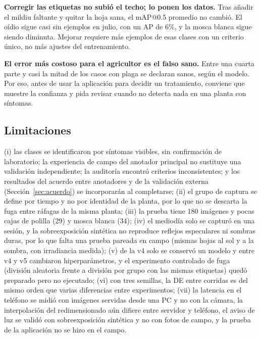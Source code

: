 \documentclass[sensors,article,submit,pdftex,moreauthors]{Definitions/mdpi}
\begin{document}
\textbf{Corregir las etiquetas no subió el techo; lo ponen los datos.} Tras añadir el mildiu faltante y quitar la hoja sana, el mAP@0.5 promedio no cambió. El oídio sigue casi sin ejemplos en julio, con un AP de 6\%, y la mosca blanca sigue siendo diminuta. Mejorar requiere más ejemplos de esas clases con un criterio único, no más ajustes del entrenamiento.

\textbf{El error más costoso para el agricultor es el falso sano.} Entre una cuarta parte y casi la mitad de los casos con plaga se declaran sanos, según el modelo. Por eso, antes de usar la aplicación para decidir un tratamiento, conviene que muestre la confianza y pida revisar cuando no detecta nada en una planta con síntomas.

\subsection{Limitaciones}\label{sec:limitaciones}

(i) las clases se identificaron por síntomas visibles, sin confirmación de laboratorio; la experiencia de campo del anotador principal no sustituye una validación independiente; la auditoría encontró criterios inconsistentes; y los resultados del acuerdo entre anotadores y de la validación externa (Sección~\ref{sec:acuerdo}) se incorporarán al completarse; (ii) el grupo de captura se define por tiempo y no por identidad de la planta, por lo que no se descarta la fuga entre ráfagas de la misma planta; (iii) la prueba tiene 180 imágenes y pocas cajas de polilla (29) y mosca blanca (34); (iv) el mediodía solo se capturó en una sesión, y la sobreexposición sintética no reproduce reflejos especulares ni sombras duras, por lo que falta una prueba pareada en campo (mismas hojas al sol y a la sombra, con irradiancia medida); (v) de la v4 solo se conservó un modelo y entre v4 y v5 cambiaron hiperparámetros, y el experimento controlado de fuga (división aleatoria frente a división por grupo con las mismas etiquetas) quedó preparado pero no ejecutado; (vi) con tres semillas, la DE entre corridas es del mismo orden que varias diferencias entre experimentos; (vii) la latencia en el teléfono se midió con imágenes servidas desde una PC y no con la cámara, la interpolación del redimensionado aún difiere entre servidor y teléfono, el aviso de luz se validó con sobreexposición sintética y no con fotos de campo, y la prueba de la aplicación no se hizo en el campo.

\end{document}
